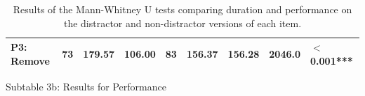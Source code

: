 \documentclass[authorversion,nonacm]{acmart}
\begin{document}
\begin{table}[t]
\begin{minipage}{0.49\linewidth}
{\begin{tabular}{lllllllll}
            P3: Remove & 73 & 179.57         & 106.00              & 83   & 156.37            & 156.28 & 2046.0 & $<$0.001***\\ \hline%
        \end{tabular}}
        \caption*{Subtable 3b: Results for Performance}
        \label{tab:pp-duration}
    \end{minipage}
    \caption{Results of the Mann-Whitney U tests comparing duration and performance on the distractor and non-distractor versions of each item.}
\end{table}

\end{document}
